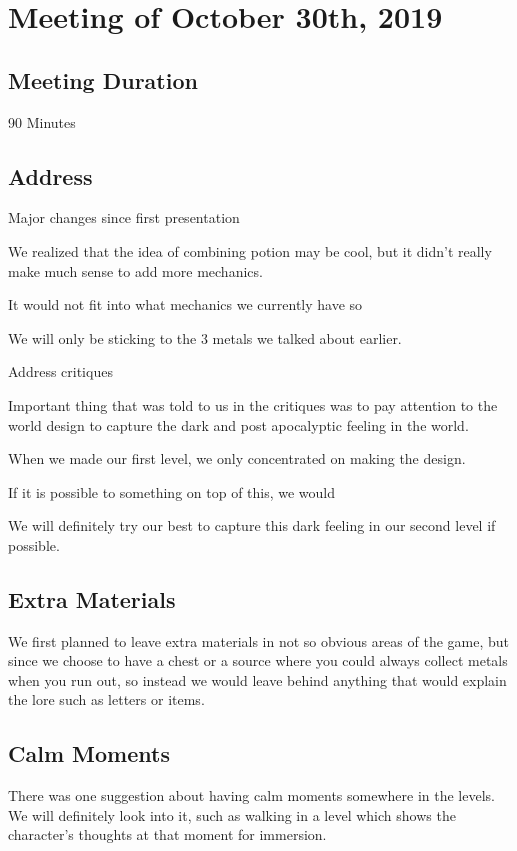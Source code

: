 \documentclass{article}
\begin{document}
\section{Meeting of October 30th, 2019}

\subsection{Meeting Duration}
90 Minutes

\subsection{Address}
Major changes since first presentation
\begin{description}
\item We  realized that the idea of combining potion may be cool, but it didn't really make much sense to add more mechanics. 
\item It would not fit into what mechanics we currently have so
\item We will only be sticking to the 3 metals we talked about earlier.
\end{description}

Address critiques
\begin{description}
\item Important thing that was told to us in the critiques was to pay attention to the world design to capture the dark and post apocalyptic feeling in the world.
\item When we made our first level, we only concentrated on making the design.
\item If it is possible to something on top of this, we would
\item We will definitely try our best to capture this dark feeling in our second level if possible.
\end{description}

\subsection{Extra Materials}
We first planned to leave extra materials in not so obvious areas of the game, but since we choose to have a chest or a source where you could always collect metals when you run out, so instead we would leave behind anything that would explain the lore such as letters or items.

\subsection{Calm Moments}
There was one suggestion about having calm moments somewhere in the levels. We will definitely look into it, such as walking in a level which shows the character’s thoughts at that moment for immersion.
\end{document}
